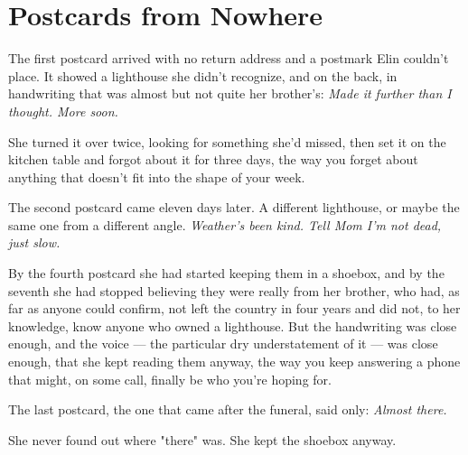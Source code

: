 \chapter{Postcards from Nowhere}

The first postcard arrived with no return address and a postmark Elin
couldn't place. It showed a lighthouse she didn't recognize, and on
the back, in handwriting that was almost but not quite her brother's:
\emph{Made it further than I thought. More soon.}

She turned it over twice, looking for something she'd missed, then set
it on the kitchen table and forgot about it for three days, the way
you forget about anything that doesn't fit into the shape of your
week.

The second postcard came eleven days later. A different lighthouse,
or maybe the same one from a different angle. \emph{Weather's been
kind. Tell Mom I'm not dead, just slow.}

By the fourth postcard she had started keeping them in a shoebox, and
by the seventh she had stopped believing they were really from her
brother, who had, as far as anyone could confirm, not left the country
in four years and did not, to her knowledge, know anyone who owned a
lighthouse. But the handwriting was close enough, and the voice — the
particular dry understatement of it — was close enough, that she kept
reading them anyway, the way you keep answering a phone that might, on
some call, finally be who you're hoping for.

The last postcard, the one that came after the funeral, said only:
\emph{Almost there.}

She never found out where "there" was. She kept the shoebox anyway.
